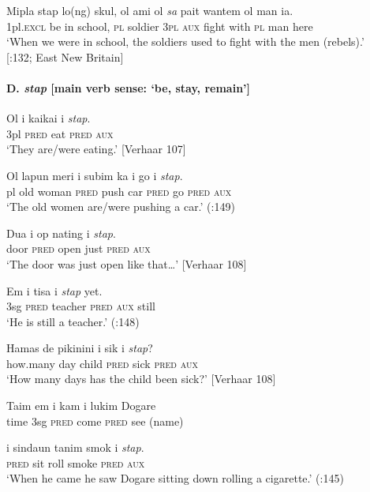 \ea
\gll Mipla  stap  lo(ng)  skul,  ol  ami  ol  \textit{sa}  pait  wantem  ol  man  ia.\\
1pl.\textsc{excl}  be  in  school,  \textsc{pl}  soldier  3\textsc{pl}  \textsc{aux}  fight  with  \textsc{pl}  man  here\\
\glt ‘When we were in school, the soldiers used to fight with the men (rebels).’\\
{}[\citealt{Smith2002}:132; East New Britain]
\z

\paragraph{D. \textit{stap}  [main verb sense: ‘be, stay, remain’]}
\ea
\gll Ol  i  kaikai  i \textit{stap}.\\
3pl  \textsc{pred}  eat  \textsc{pred}  \textsc{aux}\\
\glt ‘They are/were eating.’  [Verhaar 107]
\z

\ea
\gll   Ol  lapun  meri  i  subim  ka  i  go  i \textit{stap}.\\
pl  old  woman  \textsc{pred}  push  car  \textsc{pred}  go  \textsc{pred}  \textsc{aux}\\
\glt ‘The old women are/were pushing a car.’  (\citealt{Dutton1973}:149)
\z

\ea
\gll  Dua  i  op  nating  i \textit{stap}.\\
door  \textsc{pred}  open  just  \textsc{pred}  \textsc{aux}\\
\glt ‘The door was just open like that…’  [Verhaar 108]
\z

\ea
\gll Em  i tisa  i \textit{stap}  yet.\\
3sg  \textsc{pred} teacher  \textsc{pred  aux}  still\\
\glt ‘He is still a teacher.’  (\citealt{Dutton1973}:148)
\z

\ea
\gll  Hamas  de  pikinini  i  sik  i \textit{stap}?\\
how.many  day  child  \textsc{pred}  sick  \textsc{pred}  \textsc{aux}\\
\glt ‘How many days has the child been sick?’  [Verhaar 108]
\z

\ea
\gll  Taim  em  i  kam  i lukim  Dogare\\
time  3sg  \textsc{pred}  come  \textsc{pred}  see  (name)\\
\z

\ea
\gll   i  sindaun  tanim  smok  i  \textit{stap}.\\
\textsc{pred}  sit  roll  smoke  \textsc{pred}  \textsc{aux}\\
\glt ‘When he came he saw Dogare sitting down rolling a cigarette.’ (\citealt{Dutton1973}:145)
\z

